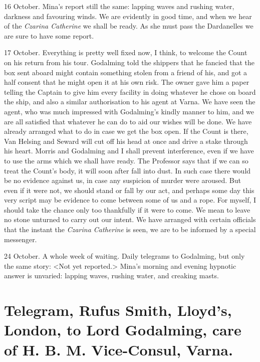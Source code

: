 \begin{diary}{16 October.}
Mina's report still the same: lapping waves and rushing water, darkness and favouring winds. We are evidently in good time, and when we hear of the \textit{Czarina Catherine} we shall be ready. As she must pass the Dardanelles we are sure to have some report.
\end{diary}

\divider

\begin{diary}{17 October.}
Everything is pretty well fixed now, I think, to welcome the Count on his return from his tour. Godalming told the shippers that he fancied that the box sent aboard might contain something stolen from a friend of his, and got a half consent that he might open it at his own risk. The owner gave him a paper telling the Captain to give him every facility in doing whatever he chose on board the ship, and also a similar authorisation to his agent at Varna. We have seen the agent, who was much impressed with Godalming's kindly manner to him, and we are all satisfied that whatever he can do to aid our wishes will be done. We have already arranged what to do in case we get the box open. If the Count is there, Van Helsing and Seward will cut off his head at once and drive a stake through his heart. Morris and Godalming and I shall prevent interference, even if we have to use the arms which we shall have ready. The Professor says that if we can so treat the Count's body, it will soon after fall into dust. In such case there would be no evidence against us, in case any suspicion of murder were aroused. But even if it were not, we should stand or fall by our act, and perhaps some day this very script may be evidence to come between some of us and a rope. For myself, I should take the chance only too thankfully if it were to come. We mean to leave no stone unturned to carry out our intent. We have arranged with certain officials that the instant the \textit{Czarina Catherine} is seen, we are to be informed by a special messenger.
\end{diary}
 

\begin{diary}{24 October.}
A whole week of waiting. Daily telegrams to Godalming, but only the same story: <Not yet reported.> Mina's morning and evening hypnotic answer is unvaried: lapping waves, rushing water, and creaking masts.
	\end{diary}

\section{Telegram, Rufus Smith, Lloyd's, London, to Lord Godalming, care of H\@. B\@. M\@. Vice-Consul, Varna.}

